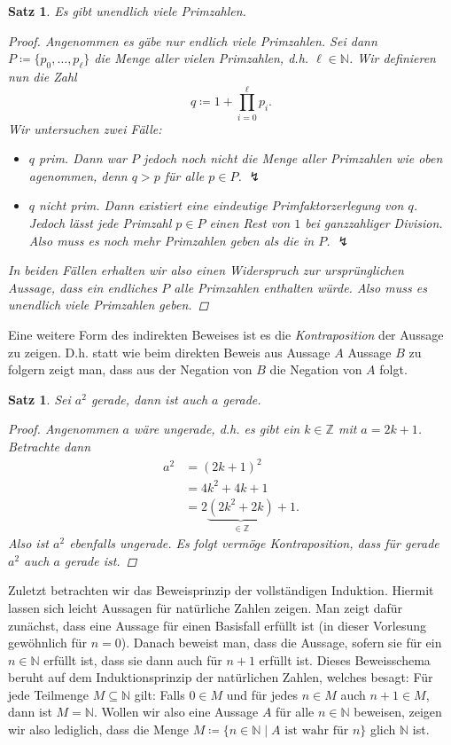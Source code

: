 \documentclass[11pt, a4paper]{article}
\theoremstyle{definition}
\theoremstyle{plain}
\newtheorem{theorem}[definition]{Satz}
\numberwithin{equation}{section}
\begin{document}
\begin{theorem}\label{thm:primes}
	Es gibt unendlich viele Primzahlen.
	\begin{proof}
		Angenommen es gäbe nur endlich viele Primzahlen. Sei dann $P \coloneqq \{p_0, \ldots, p_\ell\}$ die Menge aller vielen Primzahlen, d.h. $\ell \in \mathbb{N}$. Wir definieren nun die Zahl 
		$$
			q \coloneqq 1 + \prod_{i=0}^\ell p_i.
		$$
		Wir untersuchen zwei Fälle:
		\begin{itemize}
			\item $q$ prim. Dann war $P$ jedoch noch nicht die Menge aller Primzahlen wie oben agenommen, denn $q > p$ für alle $p \in P$. $\lightning$
			\item $q$ nicht prim. Dann existiert eine eindeutige Primfaktorzerlegung von $q$. Jedoch lässt jede Primzahl $p \in P$ einen Rest von $1$ bei ganzzahliger Division. Also muss es noch mehr Primzahlen geben als die in $P$. $\lightning$
		\end{itemize}
		In beiden Fällen erhalten wir also einen Widerspruch zur ursprünglichen Aussage, dass ein endliches $P$ alle Primzahlen enthalten würde. Also muss es unendlich viele Primzahlen geben.
	\end{proof}
\end{theorem}
Eine weitere Form des indirekten Beweises ist es die \textit{Kontraposition} der Aussage zu zeigen. D.h. statt wie beim direkten Beweis aus Aussage $A$ Aussage $B$ zu folgern zeigt man, dass aus der Negation von $B$ die Negation von $A$ folgt.
\begin{theorem}
	Sei $a^2$ gerade, dann ist auch $a$ gerade.
	\begin{proof}
		Angenommen $a$ wäre ungerade, d.h. es gibt ein $k \in \mathbb{Z}$ mit $a = 2k + 1$. Betrachte dann
		\begin{align*}
			a^2 &= (2k + 1)^2\\
			&= 4k^2 + 4k + 1\\
			&= 2\underbrace{(2k^2 + 2k)}_{\in \mathbb{Z}} + 1.
		\end{align*}
		Also ist $a^2$ ebenfalls ungerade. Es folgt vermöge Kontraposition, dass für gerade $a^2$ auch $a$ gerade ist.
	\end{proof}
\end{theorem}
Zuletzt betrachten wir das Beweisprinzip der vollständigen Induktion. Hiermit lassen sich leicht Aussagen für natürliche Zahlen zeigen. Man zeigt dafür zunächst, dass eine Aussage für einen Basisfall erfüllt ist (in dieser Vorlesung gewöhnlich für $n = 0$). Danach beweist man, dass die Aussage, sofern sie für ein $n \in \mathbb{N}$ erfüllt ist, dass sie dann auch für $n+1$ erfüllt ist. Dieses Beweisschema beruht auf dem Induktionsprinzip der natürlichen Zahlen, welches besagt: Für jede Teilmenge $M \subseteq \mathbb{N}$ gilt: Falls $0 \in M$ und für jedes $n \in M$ auch $n+1 \in M$, dann ist $M = \mathbb{N}$. Wollen wir also eine Aussage $A$ für alle $n \in \mathbb{N}$ beweisen, zeigen wir also lediglich, dass die Menge $M \coloneqq \{n \in \mathbb{N} \mid A \text{ ist wahr für } n\}$ glich $\mathbb{N}$ ist.
\end{document}
